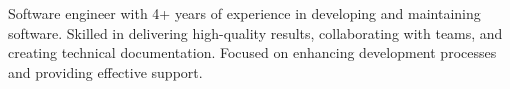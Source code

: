 \section{}
\small{Software engineer with 4+ years of experience in developing and maintaining software. Skilled in delivering high-quality results, collaborating with teams, and creating technical documentation. Focused on enhancing development processes and providing effective support.}
